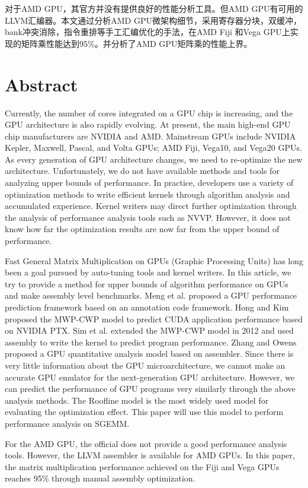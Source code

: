 对于AMD GPU，其官方并没有提供良好的性能分析工具。但AMD GPU有可用的LLVM汇编器。本文通过分析AMD GPU微架构细节，采用寄存器分块，双缓冲，bank冲突消除，指令重排等手工汇编优化的手法，在AMD Fiji 和Vega GPU上实现的矩阵乘性能达到95\%。并分析了AMD GPU矩阵乘的性能上界。

\chapter*{Abstract}%

Currently, the number of cores integrated on a GPU chip is increasing, and the GPU architecture is also rapidly evolving. At present, the main high-end GPU chip manufacturers are NVIDIA and AMD. Mainstream GPUs include NVIDIA Kepler, Maxwell, Pascal, and Volta GPUs; AMD Fiji, Vega10, and Vega20 GPUs. As every generation of GPU architecture changes, we need to re-optimize the new architecture. Unfortunately, we do not have available methods and tools for analyzing upper bounds of performance. In practice, developers use a variety of optimization methods to write efficient kernels through algorithm analysis and accumulated experience. Kernel writers may direct further optimization through the analysis of performance analysis tools such as NVVP. However, it does not know how far the optimization results are now far from the upper bound of performance.

Fast General Matrix Multiplication on GPUs (Graphic Processing Units) has long been a goal pursued by auto-tuning tools and kernel writers. In this article, we try to provide a method for upper bounds of algorithm performance on GPUs and make assembly level benchmarks. Meng et al. proposed a GPU performance prediction framework based on an annotation code framework. Hong and Kim proposed the MWP-CWP model to predict CUDA application performance based on NVIDIA PTX. Sim et al. extended the MWP-CWP model in 2012 and used assembly to write the kernel to predict program performance. Zhang and Owens proposed a GPU quantitative analysis model based on assembler. Since there is very little information about the GPU microarchitecture, we cannot make an accurate GPU emulator for the next-generation GPU architecture. However, we can predict the performance of GPU programs very similarly through the above analysis methods. The Roofline model is the most widely used model for evaluating the optimization effect. This paper will use this model to perform performance analysis on SGEMM.

For the AMD GPU, the official does not provide a good performance analysis tools. However, the LLVM assembler is available for AMD GPUs. In this paper, the matrix multiplication performance achieved on the Fiji and Vega GPUs reaches 95\% through manual assembly optimization.


